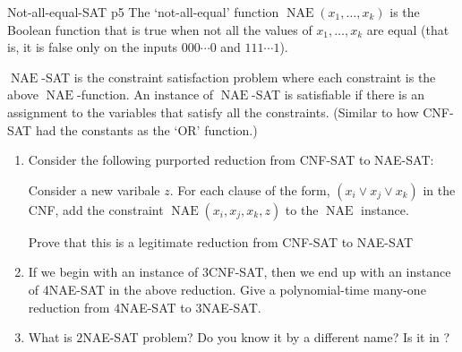 \documentclass[a4paper, 11pt]{article}
\DeclareMathOperator{\nae}{NAE}
\begin{document}
\begin{problem}{%
		Not-all-equal-SAT
	}{p5%
	}
The `not-all-equal' function $\nae(x_1,\dots, x_k)$ is the Boolean function that is true when not all the values of $x_1,\dots, x_k $ are equal (that is, it is false only on the inputs $000\cdots 0$ and $111\cdots 1$).

$\nae$-SAT is the constraint satisfaction problem where each constraint is the above $\nae$-function. An instance of $\nae$-SAT is satisfiable if there is an assignment to the variables that satisfy all the constraints. (Similar to how CNF-SAT had the constants as the `OR' function.)\begin{enumerate}[label=(\alph*)]
	\item Consider the following purported reduction from CNF-SAT to NAE-SAT:
	\begin{center}
		\begin{minipage}{0.9\textwidth}
		Consider a new varibale $z$. For each clause of the form, $(x_i\vee x_j\vee x_k)$ in the CNF, add the constraint $\nae(x_i,x_j,x_k,z)$ to the $\nae$ instance.
		\end{minipage}
	\end{center}

Prove that this is a legitimate reduction from CNF-SAT to NAE-SAT
\item If we begin with an instance of $3$CNF-SAT, then we end up with an instance of 4NAE-SAT in the above reduction. Give a polynomial-time many-one reduction from $4$NAE-SAT to $3$NAE-SAT.
\item What is $2$NAE-SAT problem? Do you know it by a different name? Is it in \sfP?
\end{enumerate}
\end{problem}
\end{document}
